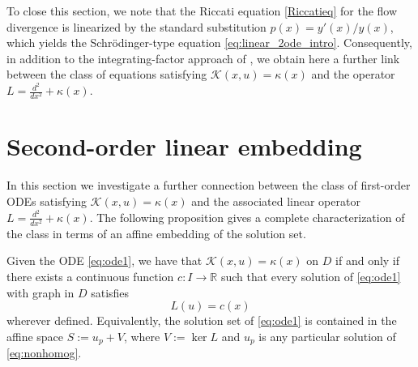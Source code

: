 \documentclass[preprint,a4paper]{elsarticle}
\begin{document}
To close this section, we note that the Riccati equation \eqref{Riccatieq} for the flow divergence is linearized by the standard substitution $p(x)=y'(x)/y(x)$, which yields the Schr\"odinger-type equation \eqref{eq:linear_2ode_intro}. Consequently, in addition to the integrating-factor approach of \cite{surfaces2025,integrationJacobifields}, we obtain here a further link between the class of equations satisfying \(\mathcal{K}(x,u)=\kappa(x)\) and the operator $L=\frac{d^{2}}{dx^{2}}+\kappa(x)$.

\section{Second-order linear embedding}\label{sec:embedding}

In this section we investigate a further connection between the class of first-order ODEs satisfying $\mathcal{K}(x,u)=\kappa(x)$ and the associated linear operator $L=\frac{d^2}{dx^2}+\kappa(x)$. The following proposition gives a complete characterization of the class in terms of an affine embedding of the solution set.



\begin{proposition}\label{prop:nonhomog}
Given the ODE \eqref{eq:ode1}, we have that $\mathcal{K}(x,u)=\kappa(x)$ on $D$ if and only if there exists a continuous function $c\colon I\to\mathbb{R}$ such that every solution of \eqref{eq:ode1} with graph in $D$ satisfies
\begin{equation}\label{eq:nonhomog}
    L(u) = c(x)
\end{equation}
wherever defined. Equivalently, the solution set of \eqref{eq:ode1} is contained in the affine space $S := u_p + V$, where $V := \ker L$ and $u_p$ is any particular solution of \eqref{eq:nonhomog}.
\end{proposition}
\end{document}
